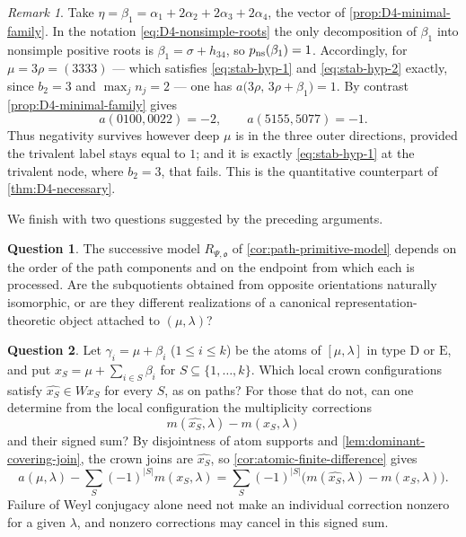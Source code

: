 \documentclass[11pt]{article}
\theoremstyle{definition}
\newtheorem{question}[question]{Question}
\theoremstyle{remark}
\newtheorem{remark}[remark]{Remark}
\newcommand{\Weyl}{W}
\newcommand{\typeD}{\ensuremath{\mathrm{D}}}
\newcommand{\typeE}{\ensuremath{\mathrm{E}}}
\begin{document}
\begin{remark}
\label{rem:D4-stable}
Take $\eta=\beta_1=\alpha_1+2\alpha_2+2\alpha_3+2\alpha_4$, the vector of
\cref{prop:D4-minimal-family}.  In the notation
\eqref{eq:D4-nonsimple-roots} the only decomposition of $\beta_1$ into
nonsimple positive roots is $\beta_1=\sigma+h_{34}$, so
$p_{\rm ns}(\beta_1)=1$.  Accordingly, for $\mu=3\rho=(3333)$ --- which
satisfies \eqref{eq:stab-hyp-1} and \eqref{eq:stab-hyp-2} exactly, since
$b_2=3$ and $\max_j n_j=2$ --- one has
$a\bigl(3\rho,\,3\rho+\beta_1\bigr)=1$.  By contrast
\cref{prop:D4-minimal-family} gives
\[
   a(0100,0022)=-2,
   \qquad
   a(5155,5077)=-1 .
\]
Thus negativity survives however deep $\mu$ is in the three outer directions,
provided the trivalent label stays equal to $1$; and it is exactly
\eqref{eq:stab-hyp-1} at the trivalent node, where $b_2=3$, that fails.  This
is the quantitative counterpart of \cref{thm:D4-necessary}.
\end{remark}

We finish with two questions suggested by the preceding arguments.

\begin{question}\label{q:path-intrinsic-model}
The successive model $R_{\Psi,\mathfrak o}$ of
\cref{cor:path-primitive-model} depends on the order of the path components
and on the endpoint from which each is processed.  Are the
subquotients obtained from opposite orientations naturally isomorphic, or are
they different realizations of a canonical representation-theoretic object
attached to $(\mu,\lambda)$?
\end{question}

\begin{question}\label{q:DE-stabilization-defects}
Let $\gamma_i=\mu+\beta_i$ ($1\le i\le k$) be the atoms of
$[\mu,\lambda]$ in type $\typeD$ or $\typeE$, and put
$x_S=\mu+\sum_{i\in S}\beta_i$ for $S\subseteq\{1,\ldots,k\}$.
Which local crown configurations satisfy
$\widehat{x_S}\in\Weyl x_S$ for every $S$, as on paths?
For those that do not, can one determine from the local configuration the
multiplicity corrections
\[
 m(\widehat{x_S},\lambda)-m(x_S,\lambda)
\]
and their signed sum?  By disjointness of atom supports and
\cref{lem:dominant-covering-join}, the crown joins are $\widehat{x_S}$, so
\cref{cor:atomic-finite-difference} gives
\[
 a(\mu,\lambda)-\sum_S(-1)^{|S|}m(x_S,\lambda)
   =\sum_S(-1)^{|S|}
      \bigl(m(\widehat{x_S},\lambda)-m(x_S,\lambda)\bigr).
\]
Failure of Weyl conjugacy alone need not make an individual correction
nonzero for a given $\lambda$, and nonzero corrections may cancel in this
signed sum.
\end{question}
\end{document}
